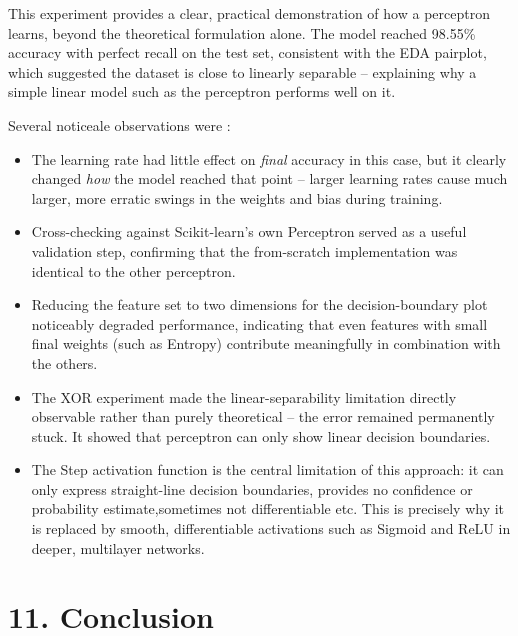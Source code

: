 \documentclass[11pt]{article}
\begin{document}
This experiment provides a clear, practical demonstration of how a perceptron learns, beyond the theoretical formulation alone. The model reached 98.55\% accuracy with perfect recall on the test set, consistent with the EDA pairplot, which suggested the dataset is close to linearly separable -- explaining why a simple linear model such as the perceptron performs well on it.

Several noticeale observations were :

\begin{itemize}[leftmargin=*]
\item The learning rate had little effect on \textit{final} accuracy in this case, but it clearly changed \textit{how} the model reached that point -- larger learning rates cause much larger, more erratic swings in the weights and bias during training.
\item Cross-checking against Scikit-learn's own Perceptron served as a useful validation step, confirming that the from-scratch implementation was identical to the other perceptron.
\item Reducing the feature set to two dimensions for the decision-boundary plot noticeably degraded performance, indicating that even features with small final weights (such as Entropy) contribute meaningfully in combination with the others.
\item The XOR experiment made the linear-separability limitation directly observable rather than purely theoretical -- the error remained permanently stuck. It showed that perceptron can only show linear decision boundaries.
\item The Step activation function is the central limitation of this approach: it can only express straight-line decision boundaries, provides no confidence or probability estimate,sometimes not differentiable etc. This is precisely why it is replaced by smooth, differentiable activations such as Sigmoid and ReLU in deeper, multilayer networks.
\end{itemize}


\section*{11. Conclusion}
\end{document}
